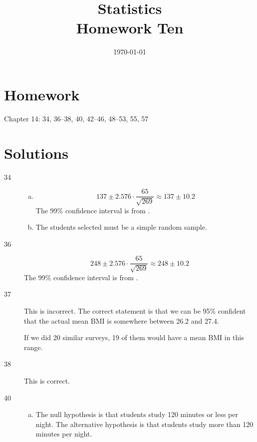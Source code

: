 \documentclass[letterpaper, landscape]{exam}
\title{Statistics \\ Homework Ten}
\date{\today}
\author{}
\begin{document}
  \maketitle

  \section{Homework}
  Chapter 14: 34, 36--38, 40, 42--46, 48--53, 55, 57

  \ifprintanswers{}
    \section{Solutions}
    \begin{description}

      \item[34] 
        \begin{enumerate}[(a)]
          \item 
            \[
              137 \pm 2.576 \cdot \frac{65}{\sqrt{269}} \approx 137 \pm 10.2
            \]
            The 99\% confidence interval is from .

          \item The students selected must be a simple random sample.

        \end{enumerate}

      \item[36] 
          \[
            248 \pm 2.576 \cdot \frac{65}{\sqrt{269}} \approx 248 \pm 10.2
          \]
          The 99\% confidence interval is from .

      \item[37] This is incorrect. The correct statement is that we can be 95\%
        confident that the actual mean BMI is somewhere between 26.2 and 27.4.

        If we did 20 similar surveys, 19 of them would have a mean BMI in this
        range.

      \item[38] This is correct. 

      \item[40]
        \begin{enumerate}[(a)]
          \item The null hypothesis is that students study 120 minutes or less
            per night. The alternative hypothesis is that students study more
            than 120 minutes per night.


\end{enumerate}
\end{description}
\end{document}
